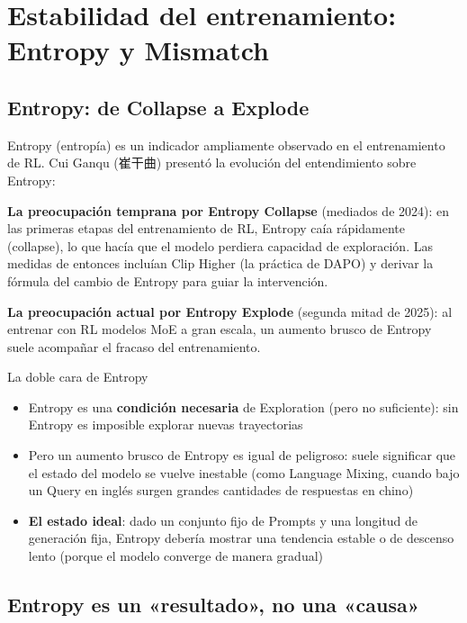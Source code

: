 \documentclass[a4paper]{article}
\begin{document}
\section{Estabilidad del entrenamiento: Entropy y Mismatch}

\subsection{Entropy: de Collapse a Explode}

Entropy (entropía) es un indicador ampliamente observado en el entrenamiento de RL. Cui Ganqu (崔干曲) presentó la evolución del entendimiento sobre Entropy:

\textbf{La preocupación temprana por Entropy Collapse} (mediados de 2024): en las primeras etapas del entrenamiento de RL, Entropy caía rápidamente (collapse), lo que hacía que el modelo perdiera capacidad de exploración. Las medidas de entonces incluían Clip Higher (la práctica de DAPO) y derivar la fórmula del cambio de Entropy para guiar la intervención.

\textbf{La preocupación actual por Entropy Explode} (segunda mitad de 2025): al entrenar con RL modelos MoE a gran escala, un aumento brusco de Entropy suele acompañar el fracaso del entrenamiento.

\begin{importantbox}{La doble cara de Entropy}
\begin{itemize}
    \item Entropy es una \textbf{condición necesaria} de Exploration (pero no suficiente): sin Entropy es imposible explorar nuevas trayectorias
    \item Pero un aumento brusco de Entropy es igual de peligroso: suele significar que el estado del modelo se vuelve inestable (como Language Mixing, cuando bajo un Query en inglés surgen grandes cantidades de respuestas en chino)
    \item \textbf{El estado ideal}: dado un conjunto fijo de Prompts y una longitud de generación fija, Entropy debería mostrar una tendencia estable o de descenso lento (porque el modelo converge de manera gradual)
\end{itemize}
\end{importantbox}

\subsection{Entropy es un «resultado», no una «causa»}
\end{document}
